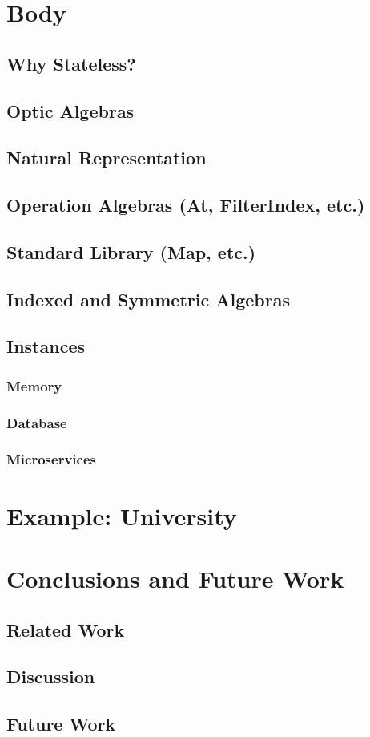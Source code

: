 \documentclass{report}
\begin{document}
\chapter{Body}
\section{Why Stateless?}
\section{Optic Algebras}
\section{Natural Representation}
\section{Operation Algebras (At, FilterIndex, etc.)}
\section{Standard Library (Map, etc.)}
\section{Indexed and Symmetric Algebras}
\section{Instances}
\subsection{Memory}
\subsection{Database}
\subsection{Microservices}

\chapter{Example: University}

\chapter{Conclusions and Future Work}
\section{Related Work}
\section{Discussion}
\section{Future Work}
\end{document}
